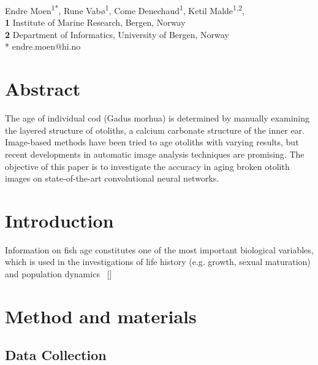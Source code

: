 \documentclass[10pt,letterpaper]{article}
\newcommand\Mycite[1]{%
  \citeauthor{#1}~[\citeyear{#1}]}
\begin{document}
\vspace*{0.2in}

\begin{flushleft}
{\Large
\textbf{}
}
\newline


Endre Moen\textsuperscript{1*},
Rune Vabø\textsuperscript{1},
Come Denechaud\textsuperscript{1},
Ketil Malde\textsuperscript{1,2},
\\
\bigskip
\textbf{1} Institute of Marine Research, Bergen, Norway
\\
\textbf{2} Department of Informatics, University of Bergen, Norway
\\
\bigskip
* endre.moen@hi.no

\end{flushleft}

\linenumbers

\section*{Abstract}

The age of individual cod (Gadus morhua) is determined by manually examining the layered structure of otoliths, a calcium carbonate structure of the inner ear. Image-based methods have been tried to age otoliths with varying results, but recent developments in automatic image analysis techniques are promising. The objective of this paper is to
investigate the accuracy in aging broken otolith images on state-of-the-art convolutional neural networks.


\section*{Introduction}

Information on fish age constitutes one of the most important biological variables, which is used
in the investigations of life history (e.g. growth, sexual maturation) and population dynamics
\Mycite{campana2001accuracy}

\section*{Method and materials}

\subsection*{Data Collection}
\end{document}
